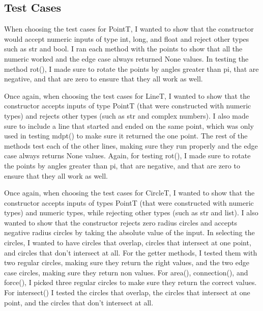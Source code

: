 \documentclass{article}
\begin{document}
\subsection{Test Cases}
{ 
\indent \indent When choosing the test cases for PointT, I wanted to show that the constructor would accept numeric inputs of type int, long, and float and reject other types such as str and bool. I ran each method with the points to show that all the numeric worked and the edge case always returned None values. In testing the method rot(), I made sure to rotate the points by angles greater than pi, that are negative, and that are zero to ensure that they all work as well.

\indent Once again, when choosing the test cases for LineT, I wanted to show that the constructor accepts inputs of type PointT (that were constructed with numeric types) and rejects other types (such as str and complex numbers). I also made sure to include a line that started and ended on the same point, which was only used in testing mdpt() to make sure it returned the one point. The rest of the methods test each of the other lines, making sure they run properly and the edge case always returns None values. Again, for testing rot(), I made sure to rotate the points by angles greater than pi, that are negative, and that are zero to ensure that they all work as well.

\indent Once again, when choosing the test cases for CircleT, I wanted to show that the constructor accepts inputs of types PointT (that were constructed with numeric types) and numeric types, while rejecting other types (such as str and list). I also wanted to show that the constructor rejects zero radius circles and accepts negative radius circles by taking the absolute value of the input. In selecting the circles, I wanted to have circles that overlap, circles that intersect at one point, and circles that don't intersect at all. For the getter methods, I tested them with two regular circles, making sure they return the right values, and the two edge case circles, making sure they return non values. For area(), connection(), and force(), I picked three regular circles to make sure they return the correct values. For intersect() I tested the circles that overlap, the circles that intersect at one point, and the circles that don't intersect at all.

}
\end{document}
